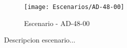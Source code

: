 \begin{figure}[H]
\centering
\texttt{[image: Escenarios/AD-48-00]}
\caption{Escenario - AD-48-00}
\label{fig:AD-48-00}
\end{figure}

Descripcion escenario...
\clearpage
